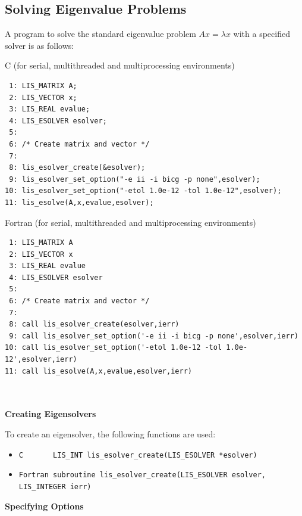\documentclass[a4paper]{article}
\begin{document}
\subsection{Solving Eigenvalue Problems}\label{subsec:solve}
A program to solve the standard eigenvalue problem $Ax = \lambda x$ with a specified 
solver is as follows: 
\begin{itemsquarebox}[l]{C (for serial, multithreaded and multiprocessing environments)}
\small
\begin{verbatim}
 1: LIS_MATRIX A; 
 2: LIS_VECTOR x; 
 3: LIS_REAL evalue; 
 4: LIS_ESOLVER esolver; 
 5: 
 6: /* Create matrix and vector */ 
 7: 
 8: lis_esolver_create(&esolver); 
 9: lis_esolver_set_option("-e ii -i bicg -p none",esolver); 
10: lis_esolver_set_option("-etol 1.0e-12 -tol 1.0e-12",esolver); 
11: lis_esolve(A,x,evalue,esolver); 
\end{verbatim}
\end{itemsquarebox}
\begin{itemsquarebox}[l]{Fortran (for serial, multithreaded and multiprocessing environments)}
\small
\begin{verbatim}
 1: LIS_MATRIX A 
 2: LIS_VECTOR x 
 3: LIS_REAL evalue
 4: LIS_ESOLVER esolver 
 5:
 6: /* Create matrix and vector */ 
 7:
 8: call lis_esolver_create(esolver,ierr) 
 9: call lis_esolver_set_option('-e ii -i bicg -p none',esolver,ierr) 
10: call lis_esolver_set_option('-etol 1.0e-12 -tol 1.0e-12',esolver,ierr) 
11: call lis_esolve(A,x,evalue,esolver,ierr) 
\end{verbatim}
\end{itemsquarebox}
\\ \\
\noindent
{\bf Creating Eigensolvers}

To create an eigensolver, the following functions are used:
\begin{itemize}
\item \verb|C       LIS_INT lis_esolver_create(LIS_ESOLVER *esolver)|
\item \verb|Fortran subroutine lis_esolver_create(LIS_ESOLVER esolver, LIS_INTEGER ierr) |
\end{itemize}

\noindent
{\bf Specifying Options}
\end{document}
